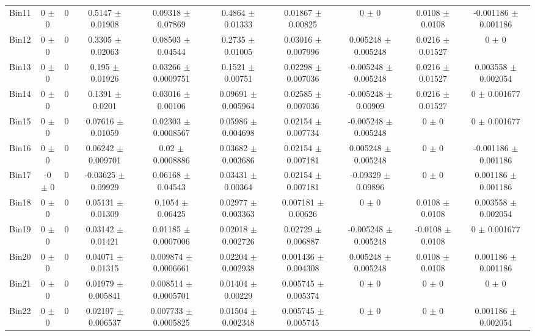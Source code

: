 \begin{tabular}{@{\extracolsep{4pt}}lccccccccc@{}}
     Bin11 & 0 $\pm$ 0 & 0 & 0.5147 $\pm$ 0.01908 & 0.09318 $\pm$ 0.07869 & 0.4864 $\pm$ 0.01333 & 0.01867 $\pm$ 0.00825 & 0 $\pm$ 0 & 0.0108 $\pm$ 0.0108 & -0.001186 $\pm$ 0.001186 \\ 
     Bin12 & 0 $\pm$ 0 & 0 & 0.3305 $\pm$ 0.02063 & 0.08503 $\pm$ 0.04544 & 0.2735 $\pm$ 0.01005 & 0.03016 $\pm$ 0.007996 & 0.005248 $\pm$ 0.005248 & 0.0216 $\pm$ 0.01527 & 0 $\pm$ 0 \\ 
     Bin13 & 0 $\pm$ 0 & 0 & 0.195 $\pm$ 0.01926 & 0.03266 $\pm$ 0.0009751 & 0.1521 $\pm$ 0.00751 & 0.02298 $\pm$ 0.007036 & -0.005248 $\pm$ 0.005248 & 0.0216 $\pm$ 0.01527 & 0.003558 $\pm$ 0.002054 \\ 
     Bin14 & 0 $\pm$ 0 & 0 & 0.1391 $\pm$ 0.0201 & 0.03016 $\pm$ 0.00106 & 0.09691 $\pm$ 0.005964 & 0.02585 $\pm$ 0.007036 & -0.005248 $\pm$ 0.00909 & 0.0216 $\pm$ 0.01527 & 0 $\pm$ 0.001677 \\ 
     Bin15 & 0 $\pm$ 0 & 0 & 0.07616 $\pm$ 0.01059 & 0.02303 $\pm$ 0.0008567 & 0.05986 $\pm$ 0.004698 & 0.02154 $\pm$ 0.007734 & -0.005248 $\pm$ 0.005248 & 0 $\pm$ 0 & 0 $\pm$ 0.001677 \\ 
     Bin16 & 0 $\pm$ 0 & 0 & 0.06242 $\pm$ 0.009701 & 0.02 $\pm$ 0.0008886 & 0.03682 $\pm$ 0.003686 & 0.02154 $\pm$ 0.007181 & 0.005248 $\pm$ 0.005248 & 0 $\pm$ 0 & -0.001186 $\pm$ 0.001186 \\ 
     Bin17 & -0 $\pm$ 0 & 0 & -0.03625 $\pm$ 0.09929 & 0.06168 $\pm$ 0.04543 & 0.03431 $\pm$ 0.00364 & 0.02154 $\pm$ 0.007181 & -0.09329 $\pm$ 0.09896 & 0 $\pm$ 0 & 0.001186 $\pm$ 0.001186 \\ 
     Bin18 & 0 $\pm$ 0 & 0 & 0.05131 $\pm$ 0.01309 & 0.1054 $\pm$ 0.06425 & 0.02977 $\pm$ 0.003363 & 0.007181 $\pm$ 0.00626 & 0 $\pm$ 0 & 0.0108 $\pm$ 0.0108 & 0.003558 $\pm$ 0.002054 \\ 
     Bin19 & 0 $\pm$ 0 & 0 & 0.03142 $\pm$ 0.01421 & 0.01185 $\pm$ 0.0007006 & 0.02018 $\pm$ 0.002726 & 0.02729 $\pm$ 0.006887 & -0.005248 $\pm$ 0.005248 & -0.0108 $\pm$ 0.0108 & 0 $\pm$ 0.001677 \\ 
     Bin20 & 0 $\pm$ 0 & 0 & 0.04071 $\pm$ 0.01315 & 0.009874 $\pm$ 0.0006661 & 0.02204 $\pm$ 0.002938 & 0.001436 $\pm$ 0.004308 & 0.005248 $\pm$ 0.005248 & 0.0108 $\pm$ 0.0108 & 0.001186 $\pm$ 0.001186 \\ 
     Bin21 & 0 $\pm$ 0 & 0 & 0.01979 $\pm$ 0.005841 & 0.008514 $\pm$ 0.0005701 & 0.01404 $\pm$ 0.00229 & 0.005745 $\pm$ 0.005374 & 0 $\pm$ 0 & 0 $\pm$ 0 & 0 $\pm$ 0 \\ 
     Bin22 & 0 $\pm$ 0 & 0 & 0.02197 $\pm$ 0.006537 & 0.007733 $\pm$ 0.0005825 & 0.01504 $\pm$ 0.002348 & 0.005745 $\pm$ 0.005745 & 0 $\pm$ 0 & 0 $\pm$ 0 & 0.001186 $\pm$ 0.002054 \\ 

\end{tabular}

